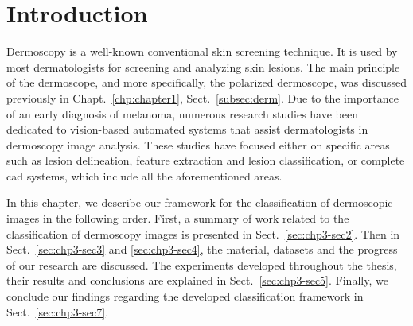 \section{Introduction}
\label{sec:chp3-sec1}
Dermoscopy is a well-known conventional skin screening technique. %
It is used by most dermatologists for screening and analyzing skin lesions.
The main principle of the dermoscope, and more specifically, the polarized dermoscope, was discussed previously in Chapt.~\ref{chp:chapter1}, Sect.~\ref{subsec:derm}.
Due to the importance of an early diagnosis of melanoma, numerous research studies have been dedicated to vision-based automated systems that assist dermatologists in dermoscopy image analysis.
These studies have focused either on specific areas such as lesion delineation, feature extraction and lesion classification, or complete \ac{cad} systems, which include all the aforementioned areas.

In this chapter, we describe our framework for the classification of dermoscopic images in the following order.
First, a summary of work related to the classification of dermoscopy images is presented in Sect.~\ref{sec:chp3-sec2}.
Then in Sect.~\ref{sec:chp3-sec3} and \ref{sec:chp3-sec4}, the material, datasets and the progress of our research are discussed.
The experiments developed throughout the thesis, their results and conclusions are explained in Sect.~\ref{sec:chp3-sec5}.
Finally, we conclude our findings regarding the developed classification framework in Sect.~\ref{sec:chp3-sec7}.

